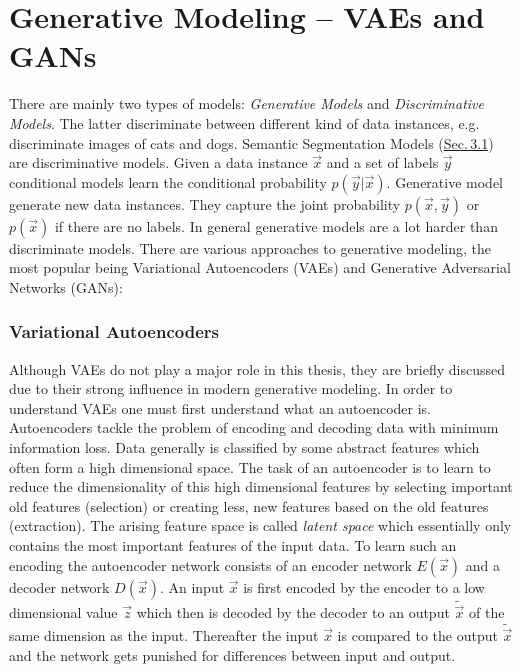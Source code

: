 \section[Generative Modeling – VAEs and GANs]{Generative Modeling – VAEs and GANs%
    }
There are mainly two types of models: \textit{Generative Models} and \textit{Discriminative Models}. The latter discriminate between different kind of data instances, e.g. discriminate images of cats and dogs. Semantic Segmentation Models (\hyperref[sec:3.1]{Sec.\,3.1}) are discriminative models. Given a data instance $\vec{x}$ and a set of labels $\vec{y}$ conditional models learn the conditional probability $p(\vec{y}|\vec{x})$. Generative model generate new data instances. They capture the joint probability $p(\vec{x},\vec{y})$ or $p(\vec{x})$ if there are no labels. In general generative models are a lot harder than discriminate models. There are various approaches to generative modeling, the most popular being Variational Autoencoders (VAEs) and Generative Adversarial Networks (GANs):

\subsubsection{Variational Autoencoders}
Although VAEs \cite{vae_original} do not play a major role in this thesis, they are briefly discussed due to their strong influence in modern generative modeling. In order to understand VAEs one must first understand what an autoencoder is. Autoencoders tackle the problem of encoding and decoding data with minimum information loss. Data generally is classified by some abstract features which often form a high dimensional space. The task of an autoencoder is to learn to reduce the dimensionality of this high dimensional features by selecting important old features (selection) or creating less, new features based on the old features (extraction). The arising feature space is called \textit{latent space} which essentially only contains the most important features of the input data. To learn such an encoding the autoencoder network consists of an encoder network $E(\vec{x})$ and a decoder network $D(\vec{x})$. An input $\vec{x}$ is first encoded by the encoder to a low dimensional value $\vec{z}$ which then is decoded by the decoder to an output $\tilde{\vec{x}}$ of the same dimension as the input. Thereafter the input $\vec{x}$ is compared to the output $\tilde{\vec{x}}$ and the network gets punished for differences between input and output.

